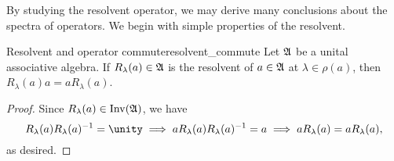 By studying the resolvent operator, we may derive many conclusions about the spectra of operators. We begin with simple properties of the resolvent.
\begin{proposition}{Resolvent and operator commute}{resolvent_commute}
    Let \(\mathfrak{A}\) be a unital associative algebra. If \(R_{\lambda}(a) \in \mathfrak{A}\) is the resolvent of \(a \in \mathfrak{A}\) at \(\lambda \in \rho(a)\), then \(R_{\lambda}(a)a = aR_{\lambda}(a)\).
\end{proposition}
\begin{proof}
    Since \(R_{\lambda}(a) \in \operatorname{Inv}(\mathfrak{A})\), we have
    \begin{equation*}
        R_{\lambda}(a) R_{\lambda}(a)^{-1} = \unity \implies a R_{\lambda}(a) R_{\lambda}(a)^{-1} = a \implies a R_{\lambda}(a) = a R_{\lambda}(a),
    \end{equation*}
    as desired.
\end{proof}

